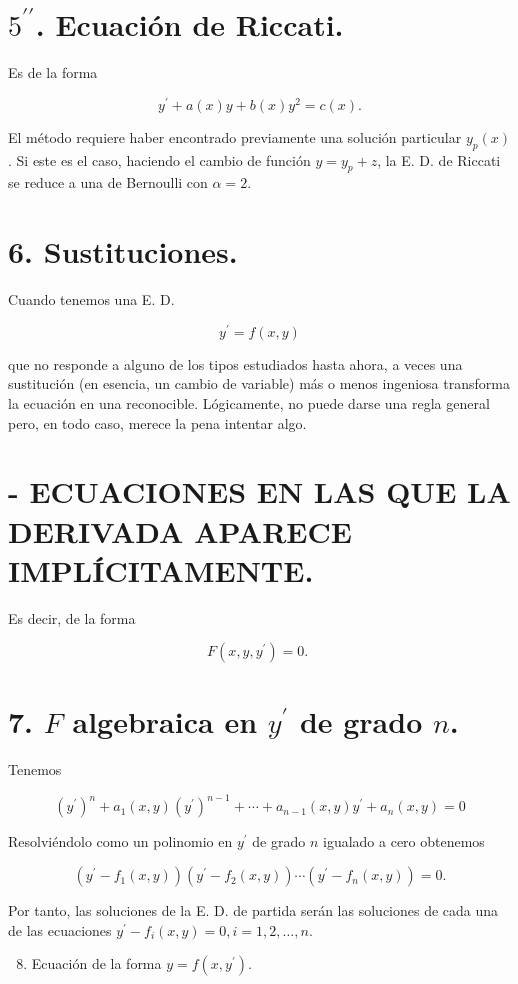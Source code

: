\documentclass[10pt]{article}
\begin{document}
\section*{$5^{\prime \prime}$. Ecuación de Riccati.}
Es de la forma

$$
y^{\prime}+a(x) y+b(x) y^{2}=c(x) .
$$

El método requiere haber encontrado previamente una solución particular $y_{p}(x)$. Si este es el caso, haciendo el cambio de función $y=y_{p}+z$, la E. D. de Riccati se reduce a una de Bernoulli con $\alpha=2$.

\section*{6. Sustituciones.}
Cuando tenemos una E. D.

$$
y^{\prime}=f(x, y)
$$

que no responde a alguno de los tipos estudiados hasta ahora, a veces una sustitución (en esencia, un cambio de variable) más o menos ingeniosa transforma la ecuación en una reconocible. Lógicamente, no puede darse una regla general pero, en todo caso, merece la pena intentar algo.

\section*{- ECUACIONES EN LAS QUE LA DERIVADA APARECE IMPLÍCITAMENTE.}
Es decir, de la forma

$$
F\left(x, y, y^{\prime}\right)=0 \text {. }
$$

\section*{7. $F$ algebraica en $y^{\prime}$ de grado $n$.}
Tenemos

$$
\left(y^{\prime}\right)^{n}+a_{1}(x, y)\left(y^{\prime}\right)^{n-1}+\cdots+a_{n-1}(x, y) y^{\prime}+a_{n}(x, y)=0
$$

Resolviéndolo como un polinomio en $y^{\prime}$ de grado $n$ igualado a cero obtenemos

$$
\left(y^{\prime}-f_{1}(x, y)\right)\left(y^{\prime}-f_{2}(x, y)\right) \cdots\left(y^{\prime}-f_{n}(x, y)\right)=0 .
$$

Por tanto, las soluciones de la E. D. de partida serán las soluciones de cada una de las ecuaciones $y^{\prime}-f_{i}(x, y)=0, i=1,2, \ldots, n$.

\begin{enumerate}
  \setcounter{enumi}{7}
  \item Ecuación de la forma $y=f\left(x, y^{\prime}\right)$.
\end{enumerate}
\end{document}
